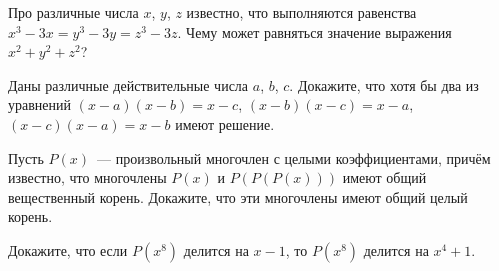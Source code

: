 \documentclass{article}
\begin{document}
\begin{enumerate_boxed}
        \item Про различные числа $x$, $y$, $z$ известно, что выполняются равенства $x^3 - 3x = y^3 - 3y = z^3 - 3z$.
        Чему может равняться значение выражения $x^2 + y^2 + z^2$?

        \item Даны различные действительные числа $a$, $b$, $c$.
        Докажите, что хотя бы два из уравнений $(x - a)(x - b) = x - c$, $(x - b)(x - c) = x - a$, $(x - c)(x - a) = x - b$ имеют решение.

        \item Пусть $P(x)$~--- произвольный многочлен с целыми коэффициентами, причём известно, что многочлены $P(x)$ и $P(P(P(x)))$ имеют общий вещественный корень.
        Докажите, что эти многочлены имеют общий целый корень.

        \item Докажите, что если $P(x^8)$ делится на $x-1$, то $P(x^8)$ делится на $x^4+1$.

    \end{enumerate_boxed}
\end{document}

